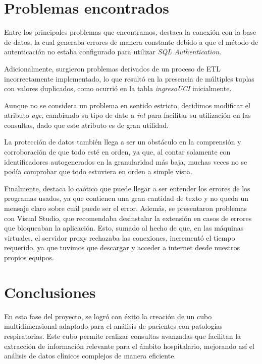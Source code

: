 \documentclass[12pt, a4paper, twoside]{article}
\begin{document}
	
	\section{Problemas encontrados}

	Entre los principales problemas que encontramos, destaca la conexión con la base de datos, la cual generaba errores de manera constante debido a que el método de autenticación no estaba configurado para utilizar \textit{SQL Authentication}.
	
	Adicionalmente, surgieron problemas derivados de un proceso de ETL incorrectamente implementado, lo que resultó en la presencia de múltiples tuplas con valores duplicados, como ocurrió en la tabla \textit{ingresoUCI} inicialmente.
	
	Aunque no se considera un problema en sentido estricto, decidimos modificar el atributo \textit{age}, cambiando su tipo de dato a \textit{int} para facilitar su utilización en las consultas, dado que este atributo es de gran utilidad.
	
	La protección de datos también llega a ser un obstáculo en la comprensión y corroboración de que todo esté en orden, ya que, al contar solamente con identificadores autogenerados en la granularidad más baja, muchas veces no se podía comprobar que todo estuviera en orden a simple vista.
	
	Finalmente, destaca lo caótico que puede llegar a ser entender los errores de los programas usados, ya que contienen una gran cantidad de texto y no queda un mensaje claro sobre cuál puede ser el error. Además, se presentaron problemas con Visual Studio, que recomendaba desinstalar la extensión en casos de errores que bloqueaban la aplicación. Esto, sumado al hecho de que, en las máquinas virtuales, el servidor proxy rechazaba las conexiones, incrementó el tiempo requerido, ya que tuvimos que descargar y acceder a internet desde nuestros propios equipos.
	

	\section{Conclusiones}
	
	En esta fase del proyecto, se logró con éxito la creación de un cubo multidimensional adaptado para el análisis de pacientes con patologías respiratorias. Este cubo permite realizar consultas avanzadas que facilitan la extracción de información relevante para el ámbito hospitalario, mejorando así el análisis de datos clínicos complejos de manera eficiente.
	
\end{document}
